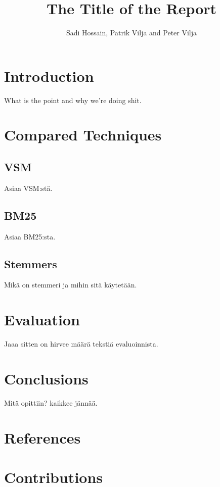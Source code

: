 \documentclass{aaltoseries}
\author{Sadi Hossain, Patrik Vilja and Peter Vilja}
\title{The Title of the Report}
\begin{document}



\tableofcontents

\chapter{Introduction}
What is the point and why we're doing shit.


\chapter{Compared Techniques}
\section{VSM}
Asiaa VSM:stä.
\section{BM25}
Asiaa BM25:sta.
\section{Stemmers}
Mikä on stemmeri ja mihin sitä käytetään.

\chapter{Evaluation}
Jaaa sitten on hirvee määrä tekstiä evaluoinnista.



\chapter{Conclusions}
Mitä opittiin? kaikkee jännää.

\chapter{References}

\chapter{Contributions}
\end{document}
